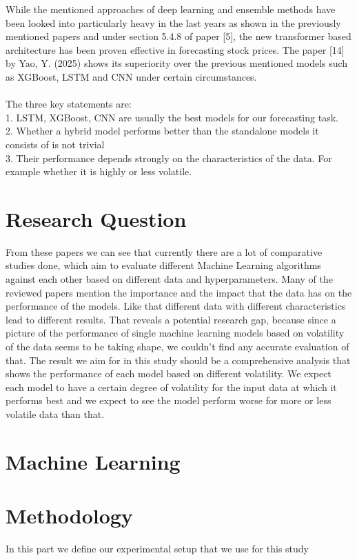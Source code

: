 \documentclass[a4paper,12pt]{report}
\begin{document}
While the mentioned approaches of deep learning and ensemble methods have been looked into particularly heavy in the last years as shown in the previously mentioned papers and under section 5.4.8 of paper [5], the new transformer based architecture has been proven effective in forecasting stock prices. The paper [14] by Yao, Y. (2025) shows its superiority over the previous mentioned models such as XGBoost, LSTM and CNN under certain circumstances.\\\\
The three key statements are:\\[0,2cm]
1.	LSTM, XGBoost, CNN are usually the best models for our forecasting task.\\
2.	Whether a hybrid model performs better than the standalone models it consists of is not trivial\\
3.	Their performance depends strongly on the characteristics of the data. For example whether it is highly or less volatile.\\


\chapter{Research Question}
From these papers we can see that currently there are a lot of comparative studies done, which aim to evaluate different Machine Learning algorithms against each other based on different data and hyperparameters. Many of the reviewed papers mention the importance and the impact that the data has on the performance of the models. Like that different data with different characteristics lead to different results. That reveals a potential research gap, because since a picture of the performance of single machine learning models based on volatility of the data seems to be taking shape, we couldn't find any accurate evaluation of that. The result we aim for in this study should be a comprehensive analysis that shows the performance of each model based on different volatility. We expect each model to have a certain degree of volatility for the input data at which it performs best and we expect to see the model perform worse for more or less volatile data than that. 

\chapter{Machine Learning}

\chapter{Methodology}
In this part we define our experimental setup that we use for this study
\end{document}
